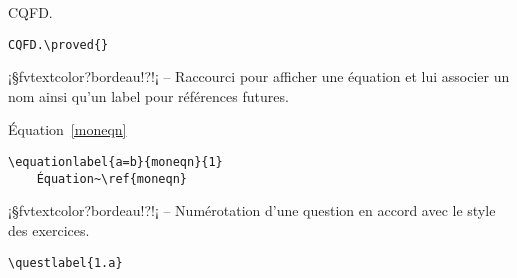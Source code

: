 \documentclass[11pt,a4paper,rgb]{report}
\begin{document}
\setlength{\leftskip}{.75cm}%
\setlength{\textwidth}{17.25cm}%

\colorbox{blue!15}{\begin{minipage}{.30\textwidth}CQFD.\proved{}\end{minipage}}
\hfill
\begin{minipage}{.65\textwidth}
	\begin{lstlisting}[linewidth=\textwidth, language={[LaTeX]TeX}]
	CQFD.\proved{}
	\end{lstlisting}
\end{minipage}

\setlength{\leftskip}{0pt}
\setlength{\textwidth}{18cm}%


\vspace*{.75cm}

\inCodeStub¡§fvtextcolor?bordeau!?!¡ -- Raccourci pour afficher une équation et lui associer un nom ainsi qu'un label pour références futures.

\setlength{\leftskip}{.75cm}%
\setlength{\textwidth}{17.25cm}%

\colorbox{blue!15}{\begin{minipage}{.30\textwidth}\newline
Équation~\ref{moneqn}\end{minipage}}
\hfill
\begin{minipage}{.65\textwidth}
	\begin{lstlisting}[linewidth=\textwidth, language={[LaTeX]TeX}]
	\equationlabel{a=b}{moneqn}{1}
	Équation~\ref{moneqn}
	\end{lstlisting}
\end{minipage}

\setlength{\leftskip}{0pt}
\setlength{\textwidth}{18cm}%


\vspace*{.75cm}

\inCodeStub¡§fvtextcolor?bordeau!?!¡ -- Numérotation d'une question en accord avec le style des exercices.

\setlength{\leftskip}{.75cm}%
\setlength{\textwidth}{17.25cm}%

\colorbox{blue!15}{}
\hfill
\begin{minipage}{.65\textwidth}
	\begin{lstlisting}[linewidth=\textwidth, language={[LaTeX]TeX}]
	\questlabel{1.a}
	\end{lstlisting}
\end{minipage}
\end{document}
